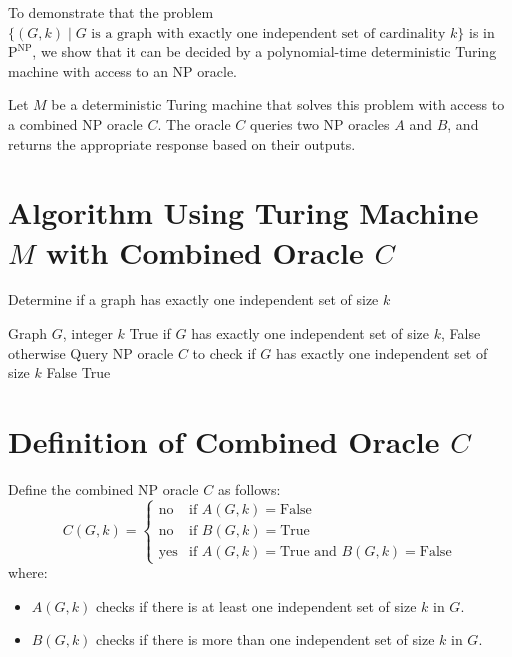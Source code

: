 \documentclass{article}
\begin{document}
To demonstrate that the problem \(\{(G, k) \mid G \text{ is a graph with exactly one independent set of cardinality } k\}\) is in \(\text{P}^{\text{NP}}\), we show that it can be decided by a polynomial-time deterministic Turing machine with access to an NP oracle.

Let \( M \) be a deterministic Turing machine that solves this problem with access to a combined NP oracle \( C \). The oracle \( C \) queries two NP oracles \( A \) and \( B \), and returns the appropriate response based on their outputs.

\section*{Algorithm Using Turing Machine \( M \) with Combined Oracle \( C \)}

\begin{mdframed}
\begin{algorithm}[H]
\caption{Determine if a graph has exactly one independent set of size \( k \)}
\begin{algorithmic}[1]
\REQUIRE Graph \( G \), integer \( k \)
\ENSURE True if \( G \) has exactly one independent set of size \( k \), False otherwise
\STATE Query NP oracle \( C \) to check if \( G \) has exactly one independent set of size \( k \)
   \RETURN False
\ENDIF
\RETURN True
\end{algorithmic}
\end{algorithm}
\end{mdframed}

\section*{Definition of Combined Oracle \( C \)}

Define the combined NP oracle \( C \) as follows:
\[ C(G, k) = 
\begin{cases} 
\text{no} & \text{if } A(G, k) = \text{False} \\
\text{no} & \text{if } B(G, k) = \text{True} \\
\text{yes} & \text{if } A(G, k) = \text{True} \text{ and } B(G, k) = \text{False}
\end{cases}
\]
where:
\begin{itemize}
    \item \( A(G, k) \) checks if there is at least one independent set of size \( k \) in \( G \).
    \item \( B(G, k) \) checks if there is more than one independent set of size \( k \) in \( G \).
\end{itemize}
\end{document}
